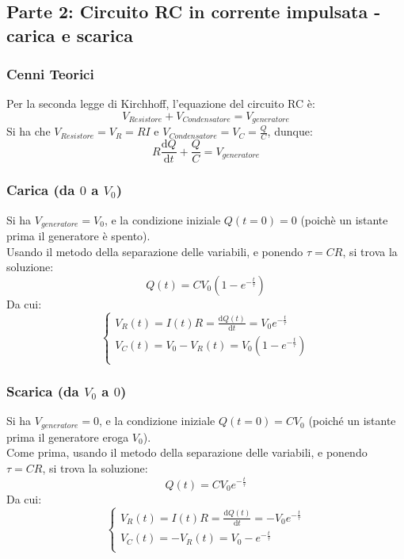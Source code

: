 \clearpage
\subsection{Parte 2: Circuito RC in corrente impulsata - carica e scarica}
\label{sec:C3_P2-1}

\subsubsection{Cenni Teorici}

Per la seconda legge di Kirchhoff, l'equazione del circuito RC è:
$$ V_{Resistore} + V_{Condensatore} = V_{generatore} $$
Si ha che $ V_{Resistore} = V_R = RI$ e $ V_{Condensatore} = V_C = \frac{Q}{C} $, dunque:
$$ R \frac{\mathrm d Q }{\mathrm d t} + \frac{Q}{C} = V_{generatore} $$
%

\subsubsection*{Carica (da $0$ a $V_0$)}

Si ha $V_{generatore} = V_0$, e la condizione iniziale $Q(t=0) = 0 $ (poichè un istante prima il generatore è spento).\\
Usando il metodo della separazione delle variabili, e ponendo $\tau = CR $, si trova la soluzione:
$$ Q(t) = CV_0(1-e^{-\frac{t}{\tau}})$$
Da cui:
\[
  \begin{cases}
    V_R(t) = I(t) R = \frac{\mathrm d Q(t) }{\mathrm d t} = V_0e^{-\frac{t}{\tau}}\\
    V_C(t) = V_0 - V_R(t) = V_0(1-e^{-\frac{t}{\tau}})\\
  \end{cases}
\]



\subsubsection*{Scarica (da $V_0$ a $0$)}

Si ha $V_{generatore} = 0$, e la condizione iniziale $Q(t=0) =CV_0 $ (poiché un istante prima il generatore eroga $V_0$).\\
Come prima, usando il metodo della separazione delle variabili, e ponendo $\tau = CR $, si trova la soluzione:
$$ Q(t) = CV_0 e^{-\frac{t}{\tau}}$$
Da cui:
\[
  \begin{cases}
    V_R(t) = I(t) R = \frac{\mathrm d Q(t) }{\mathrm d t} = -V_0e^{-\frac{t}{\tau}}\\
    V_C(t) = - V_R(t) = V_0-e^{-\frac{t}{\tau}}\\
  \end{cases}
\]

